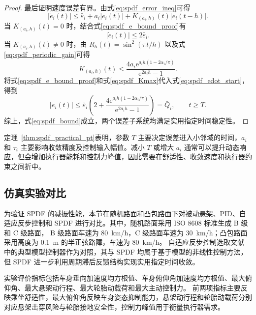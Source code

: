 \begin{proof}
最后证明速度误差有界。由式\eqref{eq:spdf_error_ineq}可得
\begin{equation}
|\dot e_i(t)|
\leq
\bar\varepsilon_i+a_i|e_i(t)|+K_{(a_i,h)}(t)|e_i(t-h)|.
\label{eq:spdf_edot_start}
\end{equation}
当 $K_{(a_i,h)}(t)=0$ 时，结合式\eqref{eq:spdf_e_bound_proof}有
\begin{equation}
|\dot e_i(t)|\leq 2\bar\varepsilon_i.
\label{eq:spdf_edot_zeroK}
\end{equation}
当 $K_{(a_i,h)}(t)\neq0$ 时，由 $R_h(t)=\sin^2(\pi t/h)$ 以及式\eqref{eq:spdf_periodic_gain}可得
\begin{equation}
K_{(a_i,h)}(t)
\leq
\frac{4a_i\mathrm e^{a_ih(1-2\alpha_i/\pi)}}{\mathrm e^{2a_ih}-1}.
\label{eq:spdf_Kmax}
\end{equation}
将式\eqref{eq:spdf_e_bound_proof}和式\eqref{eq:spdf_Kmax}代入式\eqref{eq:spdf_edot_start}，得到
\begin{equation}
|\dot e_i(t)|
\leq
\bar\varepsilon_i
\left(
2+\frac{4\mathrm e^{a_ih(1-2\alpha_i/\pi)}}{\mathrm e^{2a_ih}-1}
\right)
=\bar Q_i,\qquad t\geq T.
\label{eq:spdf_edot_bound_proof}
\end{equation}
综上，式\eqref{eq:spdf_bound}成立，两个误差子系统均满足实用指定时间稳定性。
\end{proof}

定理~\ref{thm:spdf_practical_pt}表明，参数 $T$ 主要决定误差进入小邻域的时间，$a_i$ 和 $\tau_i$ 主要影响收敛精度及控制输入幅值。减小 $T$ 或增大 $a_i$ 通常可以提升动态响应，但会增加执行器能耗和控制力峰值，因此需要在舒适性、收敛速度和执行器约束之间折中。

\subsection{仿真实验对比}
\label{sec:spdf_experiment}

为验证 SPDF 的减振性能，本节在随机路面和凸包路面下对被动悬架、PID、自适应反步控制和 SPDF 进行对比。其中，随机路面采用 ISO 8608 标准生成 B 级和 C 级路面，
B 级路面车速为 \SI{80}{km/h}，C 级路面车速为 \SI{30}{km/h}；凸包路面采用高度为 \SI{0.1}{m} 的半正弦路障，车速为 \SI{80}{km/h}。
自适应反步控制选取文献~\cite{sun2012adaptive} 中的典型模型控制器作为对照，其与 SPDF 均属于基于模型的非线性控制方法，但 SPDF 进一步利用周期滞后反馈结构实现实用指定时间收敛。

实验评价指标包括车身垂向加速度均方根值、车身俯仰角加速度均方根值、最大俯仰角、最大悬架动行程、最大轮胎动载荷和最大主动控制力。
前两项指标主要反映乘坐舒适性，最大俯仰角反映车身姿态抑制能力，悬架动行程和轮胎动载荷分别对应悬架击穿风险与轮胎接地安全性，控制力峰值用于衡量执行器需求。

